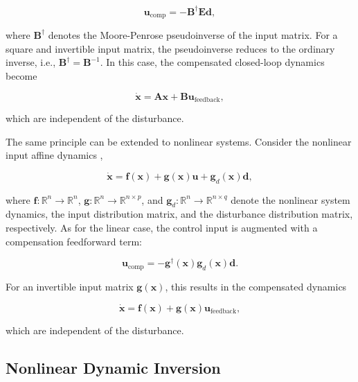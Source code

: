 \begin{equation}
	\bm{u}_{\mathrm{comp}}
	=
	-
	\bm{B}^{\dagger}
	\bm{E}
	\bm{d},
\end{equation}

where $\bm{B}^{\dagger}$ denotes the Moore-Penrose pseudoinverse of the input matrix. For a square and invertible input matrix, the pseudoinverse reduces to the ordinary inverse, i.e., $\bm{B}^{\dagger}=\bm{B}^{-1}$. In this case, the compensated closed-loop dynamics become

\begin{equation}
	\dot{\bm{x}}
	=
	\bm{A}\bm{x}
	+
	\bm{B}\bm{u}_\mathrm{feedback},
\end{equation}

which are independent of the disturbance.

The same principle can be extended to nonlinear systems. Consider the nonlinear input affine dynamics \cite{Isidori1995NonlinearControlSystems},

\begin{equation}
	\dot{\bm{x}}
	=
	\bm{f}(\bm{x})
	+
	\bm{g}(\bm{x})\bm{u}
	+
	\bm{g}_d(\bm{x})\bm{d},
	\label{eq:nonlinearInputAffineSS}
\end{equation}


where $\bm{f}: \mathbb{R}^{n} \rightarrow \mathbb{R}^{n}$, $\bm{g}: \mathbb{R}^{n} \rightarrow \mathbb{R}^{n \times p}$, and $\bm{g}_d: \mathbb{R}^{n} \rightarrow \mathbb{R}^{n \times q}$ denote the nonlinear system dynamics, the input distribution matrix, and the disturbance distribution matrix, respectively. As for the linear case, the control input is augmented with a compensation feedforward term:

\begin{equation}
	\bm{u}_{\mathrm{comp}}
	=
	-
	\bm{g}^{\dagger}(\bm{x})
	\bm{g}_d(\bm{x})
	\bm{d}.
\end{equation}

For an invertible input matrix $\bm{g}(\bm{x})$, this results in the compensated dynamics

\begin{equation}
	\dot{\bm{x}}
	=
	\bm{f}(\bm{x})
	+
	\bm{g}(\bm{x})
	\bm{u}_{\mathrm{feedback}},
\end{equation}

which are independent of the disturbance.


\subsection{Nonlinear Dynamic Inversion}

